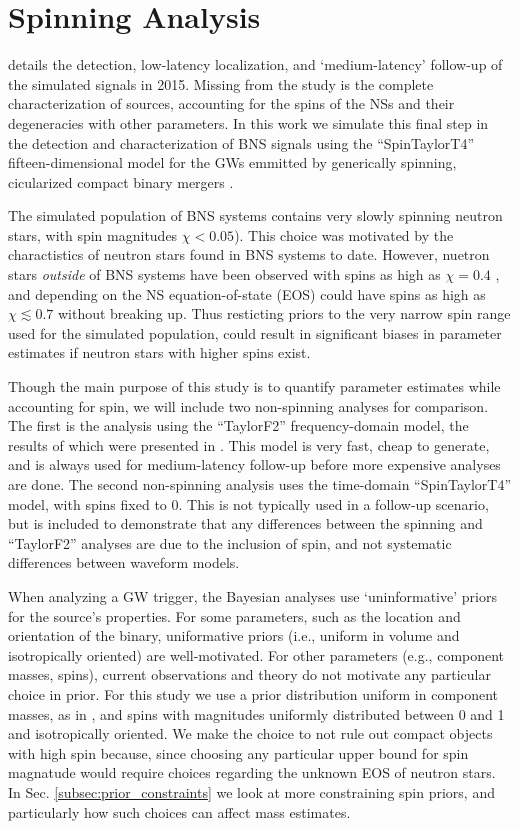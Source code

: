 \section{Spinning Analysis}

\citet{Singer_2014} details the detection, low-latency localization, and `medium-latency' follow-up of the simulated signals in 2015.  Missing from the study is the complete characterization of sources, accounting for the spins of the NSs and their degeneracies with other parameters.  In this work we simulate this final step in the detection and characterization of BNS signals using the ``SpinTaylorT4'' fifteen-dimensional model for the GWs emmitted by generically spinning, cicularized compact binary mergers \cite{Buonanno_2003,Buonanno_2009}. 

The simulated population of BNS systems contains very slowly spinning neutron stars, with spin magnitudes $\chi < 0.05$).  This choice was motivated by the charactistics of neutron stars found in BNS systems to date. However, nuetron stars \emph{outside} of BNS systems have been observed with spins as high as $\chi = 0.4$ \cite{Hessels_2006,Brown_2012}, and depending on the NS equation-of-state (EOS) could have spins as high as $\chi \lesssim 0.7$ \cite{Lo_2011} without breaking up.  Thus resticting priors to the very narrow spin range used for the simulated population, could result in significant biases in parameter estimates if neutron stars with higher spins exist.

Though the main purpose of this study is to quantify parameter estimates while accounting for spin, we will include two non-spinning analyses for comparison.  The first is the analysis using the ``TaylorF2'' frequency-domain model, the results of which were presented in \citet{Singer_2014}.  This model is very fast, cheap to generate, and is always used for medium-latency follow-up before more expensive analyses are done.  The second non-spinning analysis uses the time-domain ``SpinTaylorT4'' model, with spins fixed to 0.  This is not typically used in a follow-up scenario, but is included to demonstrate that any differences between the spinning and ``TaylorF2'' analyses are due to the inclusion of spin, and not systematic differences between waveform models.

When analyzing a GW trigger, the Bayesian analyses use `uninformative' priors for the source's properties.  For some parameters, such as the location and orientation of the binary, uniformative priors (i.e., uniform in volume and isotropically oriented) are well-motivated.  For other parameters (e.g., component masses, spins), current observations and theory do not motivate any particular choice in prior.  For this study we use a prior distribution uniform in component masses, as in \citet{2013arXiv1304.0670L}, and spins with magnitudes uniformly distributed between 0 and 1 and isotropically oriented.  We make the choice to not rule out compact objects with high spin because, since choosing any particular upper bound for spin magnatude would require choices regarding the unknown EOS of neutron stars.  In Sec. \ref{subsec:prior_constraints} we look at more constraining spin priors, and particularly how such choices can affect mass estimates.